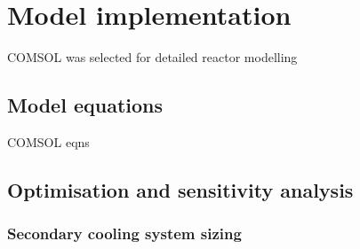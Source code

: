 \section{Model implementation}

COMSOL was selected for detailed reactor modelling

\subsection{Model equations}
COMSOL eqns

\subsection{Optimisation and sensitivity analysis}

\subsubsection{Secondary cooling system sizing}

